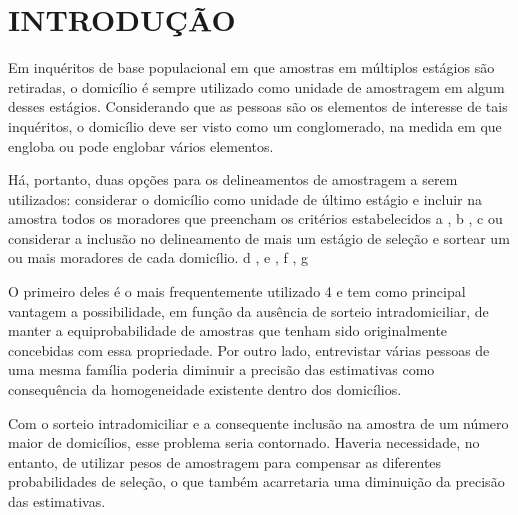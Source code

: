 \documentclass{article}
\begin{document}
\section{%
INTRODUÇÃO}

Em inquéritos de base populacional em que amostras em múltiplos estágios são retiradas, o domicílio é sempre utilizado como unidade de amostragem em algum desses estágios. Considerando que as pessoas são os elementos de interesse de tais inquéritos, o domicílio deve ser visto como um conglomerado, na medida em que engloba ou pode englobar vários elementos.

Há, portanto, duas opções para os delineamentos de amostragem a serem utilizados: considerar o domicílio como unidade de último estágio e incluir na amostra todos os moradores que preencham os critérios estabelecidos%
a%
,%
b%
,%
c%
 ou considerar a inclusão no delineamento de mais um estágio de seleção e sortear um ou mais moradores de cada domicílio.%
d%
,%
e%
,%
f%
,%
g%


O primeiro deles é o mais frequentemente utilizado%
4%
 e tem como principal vantagem a possibilidade, em função da ausência de sorteio intradomiciliar, de manter a equiprobabilidade de amostras que tenham sido originalmente concebidas com essa propriedade. Por outro lado, entrevistar várias pessoas de uma mesma família poderia diminuir a precisão das estimativas como consequência da homogeneidade existente dentro dos domicílios.

Com o sorteio intradomiciliar e a consequente inclusão na amostra de um número maior de domicílios, esse problema seria contornado. Haveria necessidade, no entanto, de utilizar pesos de amostragem para compensar as diferentes probabilidades de seleção, o que também acarretaria uma diminuição da precisão das estimativas.
\end{document}
